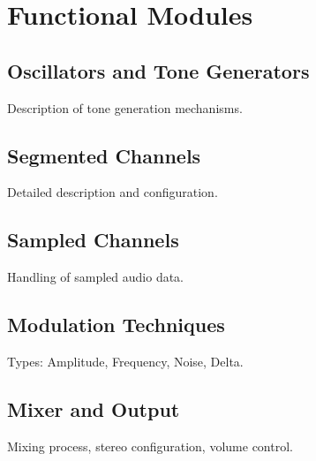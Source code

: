 \section{Functional Modules}

\subsection{Oscillators and Tone Generators}
Description of tone generation mechanisms.

\subsection{Segmented Channels}
Detailed description and configuration.

\subsection{Sampled Channels}
Handling of sampled audio data.

\subsection{Modulation Techniques}
Types: Amplitude, Frequency, Noise, Delta.

\subsection{Mixer and Output}
Mixing process, stereo configuration, volume control.